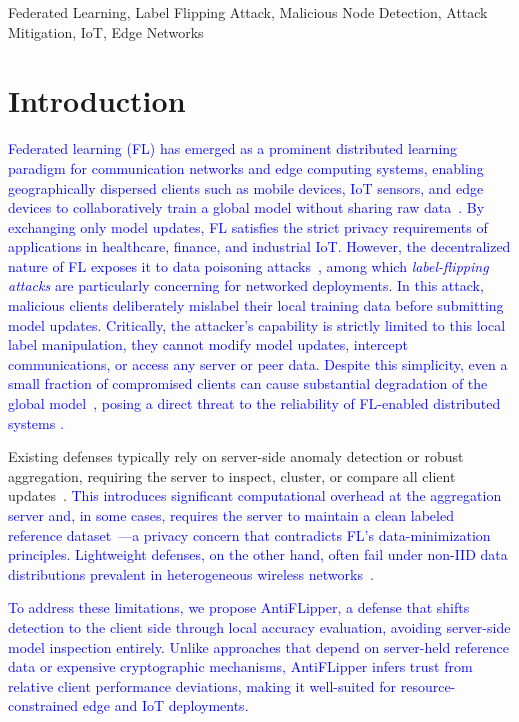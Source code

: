 \documentclass[conference]{IEEEtran}
\begin{document}
\begin{IEEEkeywords}
Federated Learning, Label Flipping Attack, Malicious Node Detection, Attack Mitigation, IoT, Edge Networks
\end{IEEEkeywords}


\section{Introduction}

\textcolor{blue}{Federated learning (FL) has emerged as a prominent distributed learning paradigm for communication networks and edge computing systems, enabling geographically dispersed clients such as mobile devices, IoT sensors, and edge devices to collaboratively train a global model without sharing raw data~\cite{fedavg-pmlr-v54-mcmahan17a,li2020federated}. By exchanging only model updates, FL satisfies the strict privacy requirements of applications in healthcare, finance, and industrial IoT. However, the decentralized nature of FL exposes it to data poisoning attacks~\cite{kairouz2021advances,lyu2020threats}, among which \textit{label-flipping attacks} are particularly concerning for networked deployments. In this attack, malicious clients deliberately mislabel their local training data before submitting model updates. Critically, the attacker's capability is strictly limited to this local label manipulation, they cannot modify model updates, intercept communications, or access any server or peer data. Despite this simplicity, even a small fraction of compromised clients can cause substantial degradation of the global model~\cite{biggio2011support,tolpegin2020data}, posing a direct threat to the reliability of FL-enabled distributed systems \cite{bagdasaryan2020backdoor}.} 

Existing defenses typically rely on server-side anomaly detection or robust aggregation, requiring the server to inspect, cluster, or compare all client updates~\cite{nguyen2022flame,yin2018byzantine,NIPS2017_f4b9ec30}. \textcolor{blue}{This introduces significant computational overhead at the aggregation server and, in some cases, requires the server to maintain a clean labeled reference dataset~\cite{cao2020fltrust}---a privacy concern that contradicts FL's data-minimization principles. Lightweight defenses, on the other hand, often fail under non-IID data distributions prevalent in heterogeneous wireless networks~\cite{fung2020limitations}.}

\textcolor{blue}{To address these limitations, we propose AntiFLipper, a defense that shifts detection to the client side through local accuracy evaluation, avoiding server-side model inspection entirely. Unlike approaches that depend on server-held reference data or expensive cryptographic mechanisms, AntiFLipper infers trust from relative client performance deviations, making it well-suited for resource-constrained edge and IoT deployments.}
\end{document}

